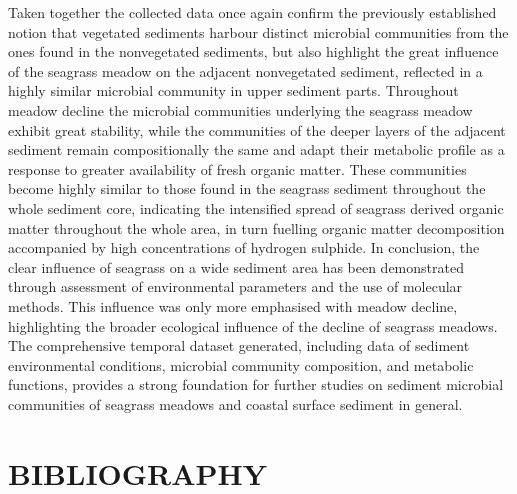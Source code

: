\documentclass[
  12 pt,
]{book}
\begin{document}
Taken together the collected data once again confirm the previously established notion that vegetated sediments harbour distinct microbial communities from the ones found in the nonvegetated sediments, but also highlight the great influence of the seagrass meadow
on the adjacent nonvegetated sediment, reflected in a highly similar microbial community in upper sediment parts. Throughout meadow decline the microbial communities underlying the seagrass meadow exhibit great stability, while the communities of the deeper layers of the adjacent sediment remain compositionally the same and adapt their metabolic profile as a response to greater availability of fresh organic matter. These communities become highly similar to those found in the seagrass sediment throughout the whole sediment core, indicating the intensified spread of seagrass derived organic matter throughout the whole area, in turn fuelling organic matter decomposition accompanied by high concentrations of hydrogen sulphide. In conclusion, the clear influence of seagrass on a wide sediment area has been demonstrated through assessment of environmental parameters and the use of molecular methods. This influence was only more emphasised with meadow decline, highlighting the broader ecological influence of the decline of seagrass meadows. The comprehensive temporal dataset generated, including data of sediment environmental conditions, microbial community composition, and metabolic functions, provides a strong foundation for further studies on sediment microbial communities of seagrass meadows and coastal surface sediment in general.

\hypertarget{bibliography}{%
\chapter{BIBLIOGRAPHY}\label{bibliography}}
\end{document}
